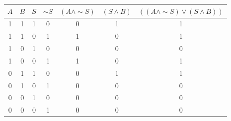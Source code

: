 \begin{tabular}{|c|c|c||c|c|c|c|}
\hline
$ A $ & $ B $ & $ S $ & $  \sim S $ & $ (A \wedge  \sim S) $ & $ (S \wedge B) $ & $ ((A \wedge  \sim S) \vee (S \wedge B)) $ \\
\hline
1 & 1 & 1 & 0 & 0 & 1 & 1 \\
1 & 1 & 0 & 1 & 1 & 0 & 1 \\
1 & 0 & 1 & 0 & 0 & 0 & 0 \\
1 & 0 & 0 & 1 & 1 & 0 & 1 \\
0 & 1 & 1 & 0 & 0 & 1 & 1 \\
0 & 1 & 0 & 1 & 0 & 0 & 0 \\
0 & 0 & 1 & 0 & 0 & 0 & 0 \\
0 & 0 & 0 & 1 & 0 & 0 & 0 \\
\hline
\end{tabular}
